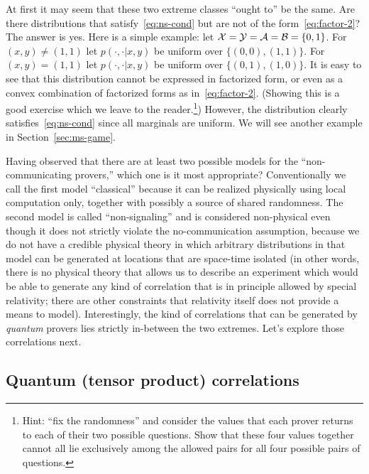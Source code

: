 At first it may seem that these two extreme classes ``ought to'' be the same. Are there distributions that satisfy~\eqref{eq:ns-cond} but are not of the form~\eqref{eq:factor-2}? The answer is yes. Here is a simple example:  let $\mathcal{X} = \mathcal{Y} = \mathcal{A}=\mathcal{B} = \{0,1\}$. For $(x,y)\neq (1,1)$ let $p(\cdot,\cdot | x,y)$ be uniform over $\{(0,0),(1,1)\}$. For $(x,y)= (1,1)$ let $p(\cdot,\cdot | x,y)$ be uniform over $\{(0,1),(1,0)\}$. It is easy to see that this distribution cannot be expressed in factorized form, or even as a convex combination of factorized forms as in~\eqref{eq:factor-2}. (Showing this is a good exercise which we leave to the reader.\footnote{Hint: ``fix the randomness'' and consider the  values that each prover returns to each of their two possible questions. Show that these four values together cannot all lie exclusively among the allowed pairs for all four possible pairs of questions.}) However, the distribution clearly satisfies~\eqref{eq:ns-cond} since all marginals are uniform. We will see another example in Section~\ref{sec:ms-game}.

Having observed that there are at least two possible models for the ``non-communicating provers,'' which one is it most appropriate? Conventionally we call the first model ``classical'' because it can be realized physically using local computation only, together with possibly a source of shared randomness. The second model is called ``non-signaling'' and is considered non-physical even though it does not strictly violate the no-communication assumption, because we do not have a credible physical theory in which arbitrary distributions in that model can be generated at locations that are space-time isolated (in other words, there is no physical theory that allows us to describe an experiment which would be able to generate any kind of correlation that is in principle allowed by special relativity; there are other constraints that relativity itself does not provide a means to model). Interestingly, the kind of correlations that can be generated by \emph{quantum} provers lies strictly in-between the two extremes. Let's explore those correlations next. 

\subsection{Quantum (tensor product) correlations}

